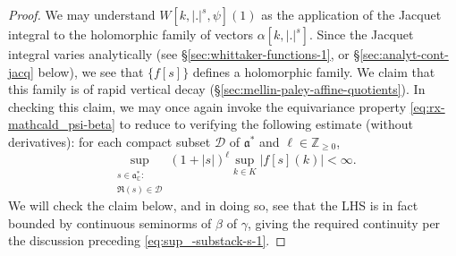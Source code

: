 \documentclass[reqno]{amsart}
\theoremstyle{plain} \newtheorem{theorem} {Theorem}
\theoremstyle{definition} \newtheorem{definition} [theorem] {Definition}
\theoremstyle{itplain} %
\numberwithin{equation}{section}
\numberwithin{theorem}{section}
\renewcommand{\geq}{\geqslant}
\begin{document}
\begin{proof}
  We may understand $W[k,|.|^s, \psi](1)$ as the application of the Jacquet integral to the holomorphic family of vectors $\alpha[k,|.|^s]$.  Since the Jacquet integral varies analytically (see \S\ref{sec:whittaker-functions-1}, or \S\ref{sec:analyt-cont-jacq} below), we see that $\{f[s]\}$ defines a holomorphic family.  We claim that this family is of rapid vertical decay (\S\ref{sec:mellin-paley-affine-quotients}).  In checking this claim, we may once again invoke the equivariance property \eqref{eq:rx-mathcald_psi-beta} to reduce to verifying the following estimate (without derivatives): for each compact subset $\mathcal{D}$ of $\mathfrak{a}^*$ and $\ell \in \mathbb{Z}_{\geq 0}$,
  \begin{equation}\label{eq:sup_-substack-s}
    \sup_{
      \substack{
        s \in \mathfrak{a}_{\mathbb{C}}^* :  \\
         \Re(s) \in \mathcal{D} 
      }
    }
    (1 + |s|)^{\ell}
    \sup_{k \in K}
    \left\lvert
      f[s](k)
    \right\rvert < \infty.    
  \end{equation}
  We will check the claim below, and in doing so, see that the LHS is in fact bounded by continuous seminorms of $\beta$ of $\gamma$, giving the required continuity per the discussion preceding \eqref{eq:sup_-substack-s-1}.


\end{proof}
\end{document}
